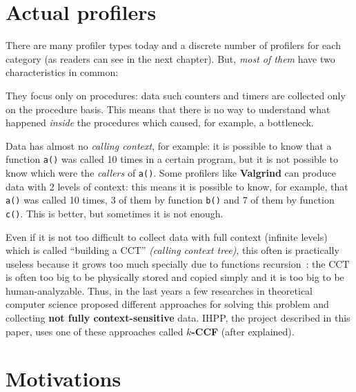\documentclass[a4paper,11pt]{report}
\begin{document}
\section{Actual profilers}

There are many profiler types today and a discrete number of profilers for
each category (as readers can see in the next chapter). But, \emph{most of them}
have two characteristics in common:

\begin{itemize*}

\item They focus only on procedures: data such counters and timers are collected
only on the procedure basis. This means that there is no way to understand what
happened \emph{inside} the procedures which caused, for example, a bottleneck.

\item Data has almost no \emph{calling context}, for example: it is possible to know that
a function \verb|a()| was called 10 times in a certain program, but it is not possible to know which were the \emph{callers} of \verb|a()|. Some profilers like \textbf{Valgrind} can
produce data with 2 levels of context: this means it is possible to know, for
example, that \verb|a()| was called 10 times, 3 of them by function
\verb|b()| and 7 of them by function \verb|c()|. This is better, but sometimes
it is not enough.

\end{itemize*}

Even if it is not too difficult to collect data with full context (infinite
levels) which is called ``building a CCT'' \emph{(calling context
tree)}, this often is practically useless because it grows too much specially due to
functions recursion~\cite{kccf}: the CCT is often too big to be physically stored and copied
simply and it is too big to be human-analyzable.
Thus, in the last years a few researches in theoretical computer science 
proposed different approaches for solving this problem and collecting \textbf{not fully context-sensitive} data. IHPP, the project described in this paper, uses one of these approaches called \textbf{$k$-CCF} (after explained).

\section{Motivations}
\end{document}
